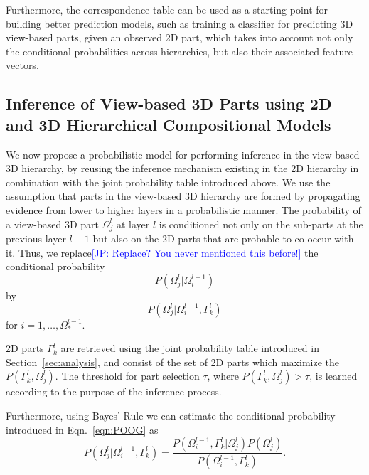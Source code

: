 \documentclass[runningheads]{llncs}
\newcommand{\commentJP}[1]{\textcolor{blue}{[JP: #1]}}
\begin{document}
Furthermore, the correspondence table can be used as a starting point for building better prediction models, such as training a classifier for predicting 3D view-based parts, given an observed 2D part, which takes into account not only the conditional probabilities across hierarchies, but also their associated feature vectors.

\subsection{Inference of View-based 3D Parts using 2D and 3D Hierarchical Compositional Models}
\label{sec:inference}

We now propose a probabilistic model for performing inference in the view-based 3D hierarchy, by reusing the inference mechanism existing in the 2D hierarchy in combination with the joint probability table introduced above.
We use the assumption that parts in the view-based 3D hierarchy are formed by propagating evidence from lower to higher layers in a probabilistic manner. 
The probability of a view-based 3D part $\Omega_j^{l}$ at layer $l$ is conditioned not only on the sub-parts at the previous layer $l-1$ but also on the 2D parts that are probable to co-occur with it.  Thus, we replace\commentJP{Replace? You never mentioned this before!} the conditional probability
\begin{equation}
 P(\Omega_j^{l} \vert \Omega_i^{l-1})
  \label{eqn:POO}
\end{equation}
by
\begin{equation}
  P(\Omega_j^{l} \vert \Omega_i^{l-1},\Gamma_k^l)
  \label{eqn:POOG}
\end{equation}
for $i=1,\dots,\Omega_*^{l-1}$.

2D parts $\Gamma_k^l$ are retrieved using the joint probability table introduced in Section~\ref{sec:analysis}, and consist of the set of 2D parts which maximize the $P(\Gamma_k^l,\Omega_j^l)$. The threshold for part selection $\tau$, where $P(\Gamma_k^l,\Omega_j^l)>\tau$, is learned according to the purpose of the inference process.

Furthermore, using Bayes' Rule we can estimate the conditional probability introduced in Eqn.~\ref{eqn:POOG} as
\begin{equation}
  P(\Omega_j^{l} \vert \Omega_i^{l-1},\Gamma_k^l) = \frac{P(\Omega_i^{l-1},\Gamma_k^l \vert \Omega_j^{l})P(\Omega_j^{l})}{P(\Omega_i^{l-1},\Gamma_k^l)}.
  \label{eqn:POOG.Bayes}
\end{equation}
\end{document}
